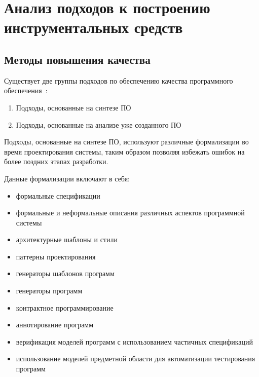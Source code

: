 \chapter{Анализ подходов к построению инструментальных средств}
\section{Методы повышения качества}
\label{sec:quality_methods}

Существует две группы подходов по обеспечению качества программного
обеспечения~\cite{itsykson}:

\begin{enumerate}
    \item Подходы, основанные на синтезе ПО
    \item Подходы, основанные на анализе уже созданного ПО
\end{enumerate}

Подходы, основанные на синтезе ПО, используют различные формализации во время
проектирования системы, таким образом позволяя избежать ошибок на более поздних
этапах разработки.

Данные формализации включают в себя:

\begin{itemize}
    \item формальные спецификации
    \item формальные и неформальные описания различных аспектов программной
    системы
    \item архитектурные шаблоны и стили
    \item паттерны проектирования
    \item генераторы шаблонов программ
    \item генераторы программ
    \item контрактное программирование
    \item аннотирование программ
    \item верификация моделей программ с использованием частичных спецификаций
    \item использование моделей предметной области для автоматизации
    тестирования программ
\end{itemize}

